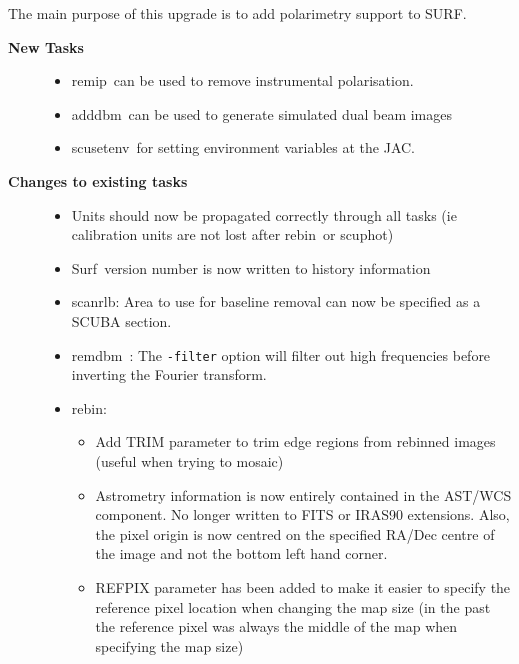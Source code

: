 \documentclass[twoside,11pt]{article}
\newcommand{\scusoft}          {{\sc Surf}}
\newcommand{\task}[1]{{\sf #1}}
\newcommand{\rebin}{\htmlref{\task{rebin}}{REBIN}}
\newcommand{\scuphot}{\htmlref{\task{scuphot}}{SCUPHOT}}
\newcommand{\scanrlb}{\htmlref{\task{scan\_rlb}}{SCAN_RLB}}
\newcommand{\remdbm}{\htmlref{\task{remdbm}}{REMDBM}}
\newcommand{\adddbm}{\htmlref{\task{add\_dbm}}{ADD_DBM}}
\newcommand{\remip}{\htmlref{\task{remip}}{REMIP}}
\newcommand{\scusetenv}{\htmlref{\task{scusetenv}}{SCUSETENV}}
\newcommand{\htmlref}[2]{#1}
\renewcommand{\_}{\texttt{\symbol{95}}}
\begin{document}
The main purpose of this upgrade is to add polarimetry support to
SURF.

\begin{description}

\item[\textbf{New Tasks}] \mbox{}

\begin{itemize}
\item \remip\ can be used to remove instrumental polarisation.
\item \adddbm\ can be used to generate simulated dual beam images
\item \scusetenv\ for setting environment variables at the JAC.
\end{itemize}

\item[\textbf{Changes to existing tasks}] \mbox{}

\begin{itemize}

\item Units should now be propagated correctly through all tasks
    (ie calibration units are not lost after \rebin\ or \scuphot)

\item \scusoft\ version number is now written to history information

\item \scanrlb: Area to use for baseline removal can now be specified
     as a SCUBA section.

\item \remdbm\ : The \texttt{-filter} option will filter out high frequencies
           before inverting the Fourier transform.

\item \rebin :
\begin{itemize}
\item Add TRIM parameter to trim edge regions from rebinned
           images (useful when trying to mosaic)

\item Astrometry information is now entirely contained in 
           the AST/WCS component. No longer written to FITS or
           IRAS90 extensions. Also, the pixel origin is now centred
           on the specified RA/Dec centre of the image and not
           the bottom left hand corner.

\item  REFPIX parameter has been added to make it easier to specify
           the reference pixel location when changing the map size
           (in the past the reference pixel was always the middle of the
           map when specifying the map size)


\end{itemize}
\end{itemize}
\end{description}
\end{document}
